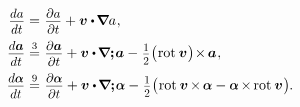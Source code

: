 \begin{otherlanguage}{russian}
\begin{tcolorbox}[breakable, enhanced, colback = orange!8, before upper={\parindent3.2ex}, parbox = false]
\nopagebreak\vspace{.1em}\begin{equation*}
\begin{array}{r@{\hspace{.66ex}}c@{\hspace{.75ex}}l}
\scalebox{0.92}[0.92]{$\displaystyle\frac{\raisemath{-0.125em}{da}}{dt}$} & = & \scalebox{0.92}[0.92]{$\displaystyle\frac{\raisemath{-0.125em}{\partial a}}{\partial t}$} + \bm{v} \dotp \hspace{-0.2ex} \boldnabla a
\hspace{.1ex} ,
\\[.8em]
\scalebox{0.92}[0.92]{$\displaystyle\frac{\raisemath{-0.125em}{d \bm{a}}}{dt}$} & \stackrel{3}{=} & \scalebox{0.92}[0.92]{$\displaystyle\frac{\raisemath{-0.125em}{\partial \bm{a}}}{\partial t}$} + \bm{v} \dotp \hspace{-0.2ex} \boldnabla\bm{;} \hspace{-0.25ex} \bm{a} - \hspace{.1ex} \smalldisplaystyleonehalf \bigl( \hspace{.1ex} \operatorname{rot}\hspace{.1ex} \bm{v} \hspace{.1ex} \bigr) \hspace{-0.4ex} \times \hspace{-0.2ex} \bm{a}
\hspace{.1ex} ,
\\[.8em]
\scalebox{0.92}[0.92]{$\displaystyle\frac{\raisemath{-0.125em}{d \mathboldalpha}}{dt}$} & \stackrel{9}{=} & \scalebox{0.92}[0.92]{$\displaystyle\frac{\raisemath{-0.125em}{\partial \mathboldalpha}}{\partial t}$} + \bm{v} \dotp \hspace{-0.2ex} \boldnabla\bm{;} \hspace{-0.25ex} \mathboldalpha - \hspace{.1ex} \smalldisplaystyleonehalf \bigl( \hspace{.1ex} \operatorname{rot}\hspace{.1ex} \bm{v} \hspace{-0.2ex} \times \hspace{-0.2ex} \mathboldalpha - \mathboldalpha \hspace{-0.2ex} \times \hspace{-0.2ex} \operatorname{rot}\hspace{.1ex} \bm{v} \hspace{.1ex} \bigr)
\hspace{-0.1ex} .
\end{array}
\end{equation*}


\end{tcolorbox}
\end{otherlanguage}
